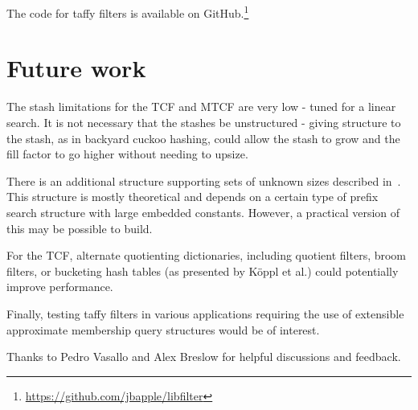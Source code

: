 \documentclass[sigconf, nonacm]{acmart}
\newcommand{\etal}{et al.}
\begin{document}
The code for taffy filters is available on GitHub.\footnote{\url{https://github.com/jbapple/libfilter}}









\section{Future work}
\label{conclusion}

The stash limitations for the TCF and MTCF are very low - tuned for a linear search.
It is not necessary that the stashes be unstructured - giving structure to the stash, as in backyard cuckoo hashing, could allow the stash to grow and the fill factor to go higher without needing to upsize.~\cite{backyard}

There is an additional structure supporting sets of unknown sizes described in~\cite{unknown-prefix}.
This structure is mostly theoretical and depends on a certain type of prefix search structure with large embedded constants.
However, a practical version of this may be possible to build.

For the TCF, alternate quotienting dictionaries, including quotient filters, broom filters, or bucketing hash tables (as presented by K\"oppl \etal{}) could potentially improve performance.~\cite{raman-practical,broom,quotient-filter}

Finally, testing taffy filters in various applications requiring the use of extensible approximate membership query structures would be of interest.

\begin{acks}
Thanks to Pedro Vasallo and Alex Breslow for helpful discussions and feedback.
\end{acks}



\pagebreak
\appendix
\end{document}
